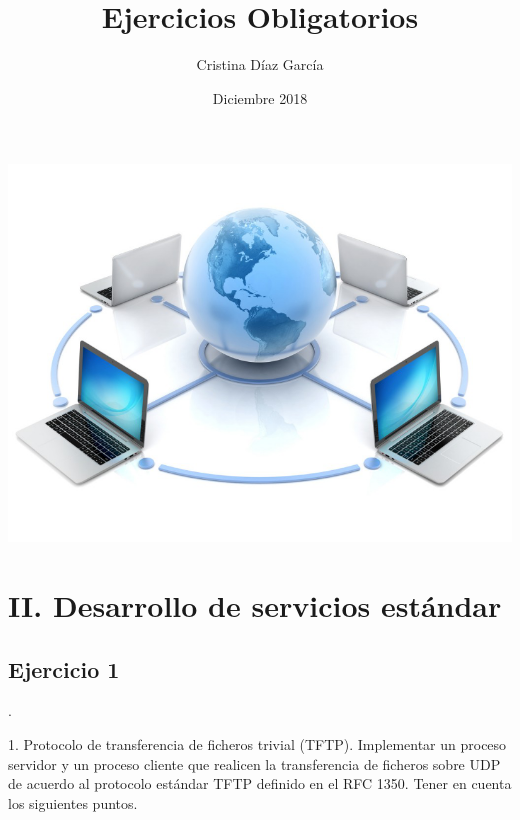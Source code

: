 \documentclass{article}
\title{Ejercicios Obligatorios}
\author{Cristina Díaz García}
\date{Diciembre 2018}
\begin{document}

\begin{titlingpage}
\maketitle

\begin{center}
\includegraphics[scale=0.4]{images/comunicaciones.png} 
\end{center}

\end{titlingpage}

\newpage

\tableofcontents

\newpage

\section{II. Desarrollo de servicios estándar}


\subsection{Ejercicio 1}.

1. Protocolo de transferencia de ficheros trivial (TFTP). Implementar un proceso servidor y un proceso cliente que realicen la transferencia de ficheros sobre UDP de acuerdo al protocolo estándar TFTP definido en el RFC 1350. Tener en cuenta los siguientes puntos.
\end{document}
